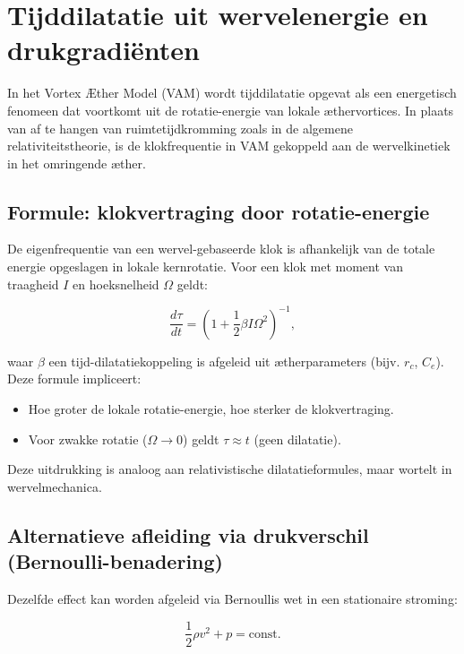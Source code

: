 
\section{Tijddilatatie uit wervelenergie en drukgradiënten}\label{sec:appendix_5}

In het Vortex Æther Model (VAM) wordt tijddilatatie opgevat als een energetisch fenomeen dat voortkomt uit de rotatie-energie van lokale æthervortices. In plaats van af te hangen van ruimtetijdkromming zoals in de algemene relativiteitstheorie, is de klokfrequentie in VAM gekoppeld aan de wervelkinetiek in het omringende æther.

\subsection{Formule: klokvertraging door rotatie-energie}

De eigenfrequentie van een wervel-gebaseerde klok is afhankelijk van de totale energie opgeslagen in lokale kernrotatie. Voor een klok met moment van traagheid $I$ en hoeksnelheid $\Omega$ geldt:

\begin{equation}
\frac{d\tau}{dt} = \left(1 + \frac{1}{2} \beta I \Omega^2 \right)^{-1},
\end{equation}

waar $\beta$ een tijd-dilatatiekoppeling is afgeleid uit ætherparameters (bijv. $r_c$, $C_e$). Deze formule impliceert:

\begin{itemize}
    \item Hoe groter de lokale rotatie-energie, hoe sterker de klokvertraging.
    \item Voor zwakke rotatie ($\Omega \to 0$) geldt $\tau \approx t$ (geen dilatatie).
\end{itemize}

Deze uitdrukking is analoog aan relativistische dilatatieformules, maar wortelt in wervelmechanica.

\subsection{Alternatieve afleiding via drukverschil (Bernoulli-benadering)}

Dezelfde effect kan worden afgeleid via Bernoulli\rqs s wet in een stationaire stroming:

\begin{equation}
\frac{1}{2} \rho v^2 + p = \text{const.}
\end{equation}

